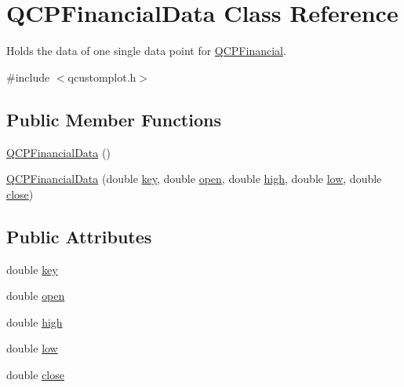 \hypertarget{class_q_c_p_financial_data}{}\section{Q\+C\+P\+Financial\+Data Class Reference}
\label{class_q_c_p_financial_data}


Holds the data of one single data point for \hyperlink{class_q_c_p_financial}{Q\+C\+P\+Financial}.  




{\ttfamily \#include $<$qcustomplot.\+h$>$}

\subsection*{Public Member Functions}
\begin{DoxyCompactItemize}
\item 
\hyperlink{class_q_c_p_financial_data_a1ca53b3a9ae4e9658a4fd1ca57d76ba4}{Q\+C\+P\+Financial\+Data} ()
\item 
\hyperlink{class_q_c_p_financial_data_a069b72c514dfd4fc8e1d5df811e54ca4}{Q\+C\+P\+Financial\+Data} (double \hyperlink{class_q_c_p_financial_data_a18bc92126f28c214b05b0161e5f5958b}{key}, double \hyperlink{class_q_c_p_financial_data_a3059e1e1fbcb9fd243fde0450f238032}{open}, double \hyperlink{class_q_c_p_financial_data_a299a4b241296fb6cd1baf5ab03f7126a}{high}, double \hyperlink{class_q_c_p_financial_data_aecce0fb45a115e3f3a25eea78491ac16}{low}, double \hyperlink{class_q_c_p_financial_data_a45e9b96944c4a08ea6c82a72d3d22df2}{close})
\end{DoxyCompactItemize}
\subsection*{Public Attributes}
\begin{DoxyCompactItemize}
\item 
double \hyperlink{class_q_c_p_financial_data_a18bc92126f28c214b05b0161e5f5958b}{key}
\item 
double \hyperlink{class_q_c_p_financial_data_a3059e1e1fbcb9fd243fde0450f238032}{open}
\item 
double \hyperlink{class_q_c_p_financial_data_a299a4b241296fb6cd1baf5ab03f7126a}{high}
\item 
double \hyperlink{class_q_c_p_financial_data_aecce0fb45a115e3f3a25eea78491ac16}{low}
\item 
double \hyperlink{class_q_c_p_financial_data_a45e9b96944c4a08ea6c82a72d3d22df2}{close}
\end{DoxyCompactItemize}


